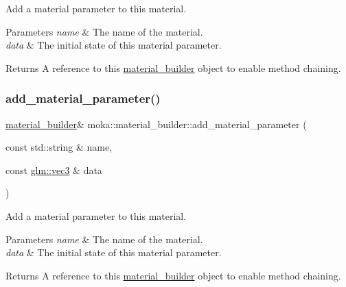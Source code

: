 Add a material parameter to this material. 


\begin{DoxyParams}{Parameters}
{\em name} & The name of the material. \\
\hline
{\em data} & The initial state of this material parameter. \\
\hline
\end{DoxyParams}
\begin{DoxyReturn}{Returns}
A reference to this \mbox{\hyperlink{classmoka_1_1material__builder}{material\+\_\+builder}} object to enable method chaining. 
\end{DoxyReturn}
\mbox{\label{classmoka_1_1material__builder_a11554de3ac69b03e2ae6acb64041b820}} 
\subsubsection{\texorpdfstring{add\_material\_parameter()}{add\_material\_parameter()}\hspace{0.1cm}{\footnotesize\ttfamily [4/7]}}
{\footnotesize\ttfamily \mbox{\hyperlink{classmoka_1_1material__builder}{material\+\_\+builder}}\& moka\+::material\+\_\+builder\+::add\+\_\+material\+\_\+parameter (\begin{DoxyParamCaption}\item[{const std\+::string \&}]{name,  }\item[{const \mbox{\hyperlink{namespacemoka_aed2224bc0e5b79e57a8975ded94ee1aaa97ade28e93c0de60adc075bdbe07ca36}{glm\+::vec3}} \&}]{data }\end{DoxyParamCaption})}



Add a material parameter to this material. 


\begin{DoxyParams}{Parameters}
{\em name} & The name of the material. \\
\hline
{\em data} & The initial state of this material parameter. \\
\hline
\end{DoxyParams}
\begin{DoxyReturn}{Returns}
A reference to this \mbox{\hyperlink{classmoka_1_1material__builder}{material\+\_\+builder}} object to enable method chaining. 
\end{DoxyReturn}
\mbox{\label{classmoka_1_1material__builder_a072f41a2e6358c376d9effaae7df84e0}} 

